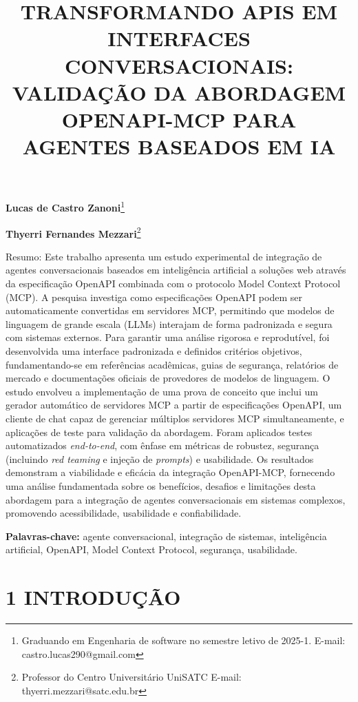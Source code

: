 \documentclass[
]{article}
\title{\textbf{TRANSFORMANDO APIS EM INTERFACES CONVERSACIONAIS:
VALIDAÇÃO DA ABORDAGEM OPENAPI-MCP PARA AGENTES BASEADOS EM IA}}
\author{}
\date{}
\begin{document}
\maketitle

\textbf{Lucas de Castro Zanoni}\footnote{Graduando em Engenharia de
  software no semestre letivo de 2025-1. E-mail:
  castro.lucas290@gmail.com}

\textbf{Thyerri Fernandes Mezzari}\footnote{Professor do Centro
  Universitário UniSATC E-mail: thyerri.mezzari@satc.edu.br}

Resumo: Este trabalho apresenta um estudo experimental de integração de
agentes conversacionais baseados em inteligência artificial a soluções
web através da especificação OpenAPI combinada com o protocolo Model
Context Protocol (MCP). A pesquisa investiga como especificações OpenAPI
podem ser automaticamente convertidas em servidores MCP, permitindo que
modelos de linguagem de grande escala (LLMs) interajam de forma
padronizada e segura com sistemas externos. Para garantir uma análise
rigorosa e reprodutível, foi desenvolvida uma interface padronizada e
definidos critérios objetivos, fundamentando-se em referências
acadêmicas, guias de segurança, relatórios de mercado e documentações
oficiais de provedores de modelos de linguagem. O estudo envolveu a
implementação de uma prova de conceito que inclui um gerador automático
de servidores MCP a partir de especificações OpenAPI, um cliente de chat
capaz de gerenciar múltiplos servidores MCP simultaneamente, e
aplicações de teste para validação da abordagem. Foram aplicados testes
automatizados \emph{end-to-end}, com ênfase em métricas de robustez,
segurança (incluindo \emph{red teaming} e injeção de \emph{prompts}) e
usabilidade. Os resultados demonstram a viabilidade e eficácia da
integração OpenAPI-MCP, fornecendo uma análise fundamentada sobre os
benefícios, desafios e limitações desta abordagem para a integração de
agentes conversacionais em sistemas complexos, promovendo
acessibilidade, usabilidade e confiabilidade.

\textbf{Palavras-chave:} agente conversacional, integração de sistemas,
inteligência artificial, OpenAPI, Model Context Protocol, segurança,
usabilidade.

\section{1 INTRODUÇÃO}\label{introduuxe7uxe3o}
\end{document}
